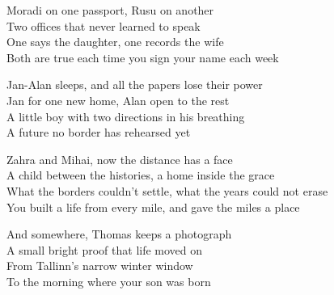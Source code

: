 \begin{lyrics}
Moradi on one passport, Rusu on another\\
Two offices that never learned to speak\\
One says the daughter, one records the wife\\
Both are true each time you sign your name each week

Jan-Alan sleeps, and all the papers lose their power\\
Jan for one new home, Alan open to the rest\\
A little boy with two directions in his breathing\\
A future no border has rehearsed yet


Zahra and Mihai, now the distance has a face\\
A child between the histories, a home inside the grace\\
What the borders couldn't settle, what the years could not erase\\
You built a life from every mile, and gave the miles a place

And somewhere, Thomas keeps a photograph\\
A small bright proof that life moved on\\
From Tallinn's narrow winter window\\
To the morning where your son was born
\end{lyrics}

